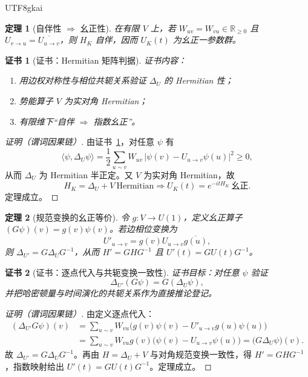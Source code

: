 \documentclass[12pt]{article}
\newtheorem{theorem}{定理}[section]
\newtheorem{Certificate}{证书}[section]
\begin{document}
\begin{CJK*}{UTF8}{gkai}
\begin{theorem}[自伴性 $\Rightarrow$ 幺正性]
\label{thm:T5}
在有限 $V$ 上，若 $W_{uv}=W_{vu}\in\mathbb R_{\ge 0}$ 且 $U_{v\to u}=\overline{U_{u\to v}}$，则 $H_K$ 自伴，因而 $U_K(t)$ 为幺正一参数群。
\end{theorem}

\begin{Certificate}[证书：Hermitian 矩阵判据]
\label{cert:T5}
证书内容：
\begin{enumerate}
\item 用边权对称性与相位共轭关系验证 $\Delta_U$ 的 Hermitian 性；
\item 势能算子 $V$ 为实对角 Hermitian；
\item 有限维下“自伴 $\Rightarrow$ 指数幺正”。
\end{enumerate}
\end{Certificate}

\begin{proof}[证明（谓词因果链）]
由证书~\ref{cert:T5}，对任意 $\psi$ 有
\[
\langle\psi,\Delta_U\psi\rangle
=\frac12\sum_{u\sim v}W_{uv}\,|\psi(v)-U_{u\to v}\psi(u)|^2\ge 0,
\]
从而 $\Delta_U$ 为 Hermitian 半正定。又 $V$ 为实对角 Hermitian，故
\[
H_K=\Delta_U+V\ \text{Hermitian}
\Rightarrow
U_K(t)=e^{-itH_K}\ \text{幺正}.
\]
定理成立。
\end{proof}

\begin{theorem}[规范变换的幺正等价]
\label{thm:T6}
令 $g:V\to U(1)$，定义幺正算子 $(G\psi)(v)=g(v)\psi(v)$。若边相位变换为
\[
U'_{u\to v}=g(v)U_{u\to v}\overline{g(u)},
\]
则 $\Delta_{U'}=G\Delta_UG^{-1}$，从而 $H' = GHG^{-1}$ 且 $U'(t)=GU(t)G^{-1}$。
\end{theorem}

\begin{Certificate}[证书：逐点代入与共轭变换一致性]
\label{cert:T6}
证书目标：对任意 $\psi$ 验证
\[
\Delta_{U'}(G\psi)=G(\Delta_U\psi),
\]
并把哈密顿量与时间演化的共轭关系作为直接推论登记。
\end{Certificate}

\begin{proof}[证明（谓词因果链）]
由定义逐点代入：
\[
\begin{aligned}
(\Delta_{U'}G\psi)(v)
&=\sum_{u\sim v}W_{vu}\bigl(g(v)\psi(v)-U'_{u\to v}g(u)\psi(u)\bigr)\\
&=\sum_{u\sim v}W_{vu}g(v)\bigl(\psi(v)-U_{u\to v}\psi(u)\bigr)
=\bigl(G\Delta_U\psi\bigr)(v).
\end{aligned}
\]
故 $\Delta_{U'}=G\Delta_UG^{-1}$。再由 $H=\Delta_U+V$ 与对角规范变换一致性，得 $H'=GHG^{-1}$，指数映射给出 $U'(t)=GU(t)G^{-1}$。定理成立。
\end{proof}


\end{CJK*}
\end{document}
